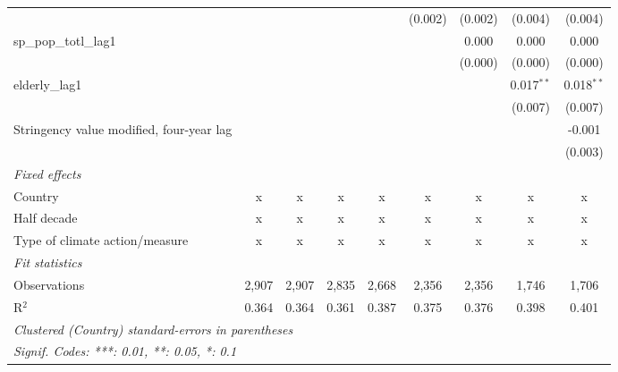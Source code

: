 \begin{tabular}{lcccccccc}
                                                                           &         &         &         &             & (0.002)     & (0.002) & (0.004)      & (0.004)\\   
   sp\_pop\_totl\_lag1                                                     &         &         &         &             &             & 0.000   & 0.000        & 0.000\\   
                                                                           &         &         &         &             &             & (0.000) & (0.000)      & (0.000)\\   
   elderly\_lag1                                                           &         &         &         &             &             &         & 0.017$^{**}$ & 0.018$^{**}$\\   
                                                                           &         &         &         &             &             &         & (0.007)      & (0.007)\\   
   Stringency value modified, four-year lag                                &         &         &         &             &             &         &              & -0.001\\   
                                                                           &         &         &         &             &             &         &              & (0.003)\\   
   \emph{Fixed effects}\\
   Country                                                                 & x       & x       & x       & x           & x           & x       & x            & x\\  
   Half decade                                                             & x       & x       & x       & x           & x           & x       & x            & x\\  
   Type of climate action/measure                                          & x       & x       & x       & x           & x           & x       & x            & x\\  
   \midrule \emph{Fit statistics}\\
   Observations                                                            & 2,907   & 2,907   & 2,835   & 2,668       & 2,356       & 2,356   & 1,746        & 1,706\\  
   R$^2$                                                                   & 0.364   & 0.364   & 0.361   & 0.387       & 0.375       & 0.376   & 0.398        & 0.401\\  
   \midrule
   \multicolumn{9}{l}{\emph{Clustered (Country) standard-errors in parentheses}}\\
   \multicolumn{9}{l}{\emph{Signif. Codes: ***: 0.01, **: 0.05, *: 0.1}}\\
\end{tabular}
\par\endgroup


